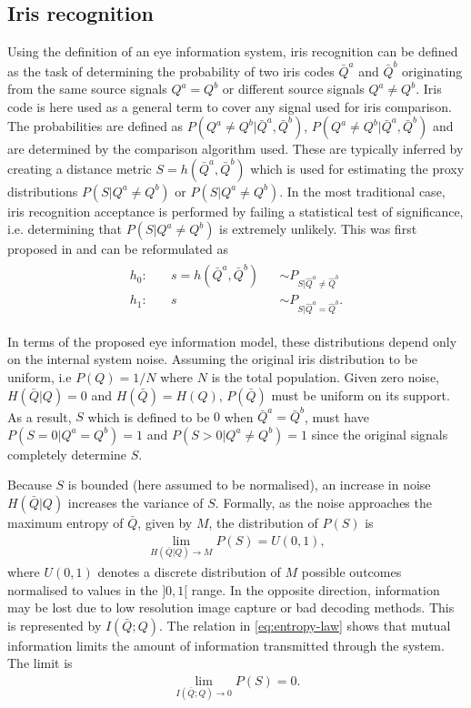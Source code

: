\subsection{Iris recognition}\label{sec:iris-goal}
Using the definition of an eye information system, iris recognition can be defined as the task of determining the probability of two iris codes $\bar{Q}^a$ and $\bar{Q}^b$ originating from the same source signals $Q^a = Q^b$ or different source signals $Q^a\neq Q^b$. Iris code is here used as a general term to cover any signal used for iris comparison. The probabilities are defined as $P(Q^a\neq Q^b|\bar{Q}^a, \bar{Q}^b)$, $P(Q^a\neq Q^b|\bar{Q}^a, \bar{Q}^b)$ and are determined by the comparison algorithm used. These are typically inferred by creating a distance metric $S = h(\bar{Q}^a, \bar{Q}^b)$ which is used for estimating the proxy distributions $P(S|Q^a\neq Q^b)$ or $P(S|Q^a\neq Q^b)$. In the most traditional case, iris recognition acceptance is performed by failing a statistical test of significance, i.e. determining that $P(S|Q^a\neq Q^b)$ is extremely unlikely. This was first proposed in \cite{DAUGMAN_IRIS_ORIG} and can be reformulated as
\begin{align}
\begin{aligned}
    h_0: & \quad s = h(\bar{Q}^a, \bar{Q}^b) &&\sim  P_{S|\hat{Q}^a\neq \hat{Q}^b}\\
    h_1: & \quad s && \sim  P_{S|\hat{Q}^a = \hat{Q}^b}.
\end{aligned}
\end{align}

In terms of the proposed eye information model, these distributions depend only on the internal system noise. Assuming the original iris distribution to be uniform, i.e $P(Q)=1/N$ where $N$ is the total population. Given zero noise, $H(\bar{Q}|Q)=0$ and $H(\bar{Q})=H(Q)$, $P(\bar{Q})$ must be uniform on its support. As a result, $S$ which is defined to be $0$ when $\bar{Q}^a = \bar{Q}^b$, must have $P(S=0|Q^a = Q^b)=1$ and $P(S>0|Q^a \neq Q^b)=1$ since the original signals completely determine $S$. 

Because $S$ is bounded (here assumed to be normalised), an increase in noise $H(\bar{Q}|Q)$ increases the variance of $S$. Formally, as the noise approaches the maximum entropy of $\bar{Q}$, given by $M$, the distribution of $P(S)$ is
\begin{align}
\lim_{H(\bar{Q}|Q)\rightarrow M} P(S) = U(0, 1),
\end{align}
where $U(0, 1)$ denotes a discrete distribution of $M$ possible outcomes normalised to values in the $]0, 1[$ range. In the opposite direction, information may be lost due to low resolution image capture or bad decoding methods. This is represented by $I(\bar{Q};Q)$. The relation in \autoref{eq:entropy-law} shows that mutual information limits the amount of information transmitted through the system. The limit is
\begin{align}
\lim_{I(\bar{Q};Q)\rightarrow 0} P(S) = 0.
\end{align}

